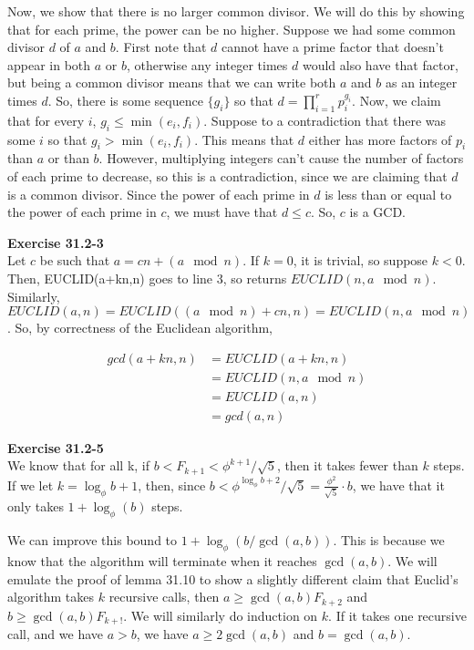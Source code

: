 \documentclass{article}
\begin{document}
Now, we show that there is no larger common divisor. We will do this by showing that for each prime, the power can be no higher. Suppose we had some common divisor $d$ of $a$ and $b$. First note that $d$ cannot have a prime factor that doesn't appear in both $a$ or $b$, otherwise any integer times $d$ would also have that factor, but being a common divisor means that we can write both $a$ and $b$ as an integer times $d$. So, there is some sequence $\{g_i\}$ so that $d = \prod_{i=1}^r p_i^{g_i}$. Now, we claim that for every $i$, $g_i \le \min(e_i,f_i)$. Suppose to a contradiction that there was some $i$ so that $g_i>\min(e_i,f_i)$. This means that $d$ either has more factors of $p_i$ than $a$ or than $b$. However, multiplying integers can't cause the number of factors of each prime to decrease, so this is a contradiction, since we are claiming that $d$ is a common divisor. Since the power of each prime in $d$ is less than or equal to the power of each prime in $c$, we must have that $d\le c$. So, $c$ is a GCD.



\noindent\textbf{Exercise 31.2-3}\\

Let $c$ be such that $a = cn +(a\mod n)$. If $k=0$, it is trivial, so suppose $k<0$. Then, EUCLID(a+kn,n) goes to line 3, so returns $EUCLID(n, a\mod n)$. Similarly, $EUCLID(a,n) = EUCLID((a\mod n) + cn, n) = EUCLID(n,a\mod n)$. So, by correctness of the Euclidean algorithm,

\begin{align*}
gcd(a+kn,n) &= EUCLID(a+kn,n)\\
& =  EUCLID(n,a\mod n)\\
& = EUCLID(a,n)\\
& = gcd(a,n)
\end{align*}



\noindent\textbf{Exercise 31.2-5}\\

We know that for all k, if $b < F_{k+1} < \phi^{k+1}/\sqrt{5}$, then it takes fewer than $k$ steps. If we let $k = \log_\phi{b} + 1$, then, since $b < \phi^{\log_\phi{b} + 2}/\sqrt{5} = \frac{\phi^2}{\sqrt{5}} \cdot b$, we have that it only takes $1+\log_\phi(b)$ steps.

We can improve this bound to $1 + \log_{\phi}(b/\gcd(a,b))$. This is because we know that the algorithm will terminate when it reaches $\gcd(a,b)$. We will emulate the proof of lemma 31.10 to show a slightly different claim that Euclid's algorithm takes $k$ recursive calls, then $a \ge \gcd(a,b) F_{k+2}$ and $b \ge \gcd(a,b) F_{k+!}$. We will similarly do induction on $k$. If it takes one recursive call, and we have $a>b$, we have $a \ge 2\gcd(a,b)$ and $b=\gcd(a,b)$.
\end{document}
